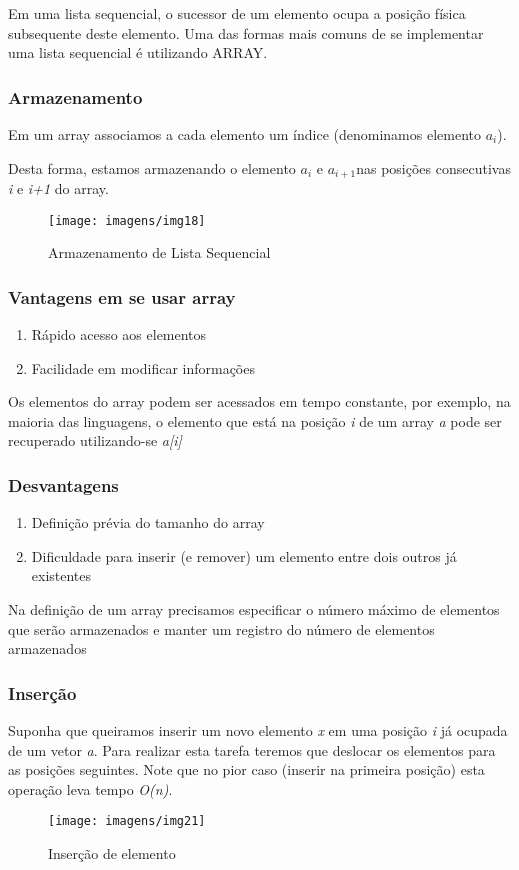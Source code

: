 \documentclass{beamer}
\begin{document}
\begin{frame}
Em uma lista sequencial, o sucessor de um elemento ocupa a posição física subsequente deste elemento. Uma das formas mais comuns de se implementar uma lista sequencial é utilizando ARRAY.
\end{frame}

\begin{frame}
\frametitle{Armazenamento}
Em um array associamos a cada elemento um índice (denominamos elemento $a_i$). 

Desta forma, estamos armazenando o elemento $a_i$  e $a_{i+1}$nas posições consecutivas  \textit{i} e \textit{i+1} do array.
 
\begin{figure}
\texttt{[image: imagens/img18]}
\caption{Armazenamento de Lista Sequencial}

\end{figure}

\end{frame}

\begin{frame}
\frametitle{Vantagens em se usar array}

\begin{enumerate}
\item Rápido acesso aos elementos
\item Facilidade em modificar informações
\end{enumerate}
Os elementos do array podem ser acessados em tempo constante, por exemplo, na maioria das linguagens, o elemento que está na posição \textit{i} de um array \textit{a} pode ser recuperado utilizando-se \textit{a[i]}
\end{frame}

\begin{frame}
\frametitle{Desvantagens}
\begin{enumerate}
\item Definição prévia do tamanho do array
\item Dificuldade para inserir (e remover) um elemento entre dois outros já existentes
\end{enumerate}

Na definição de um array precisamos especificar o número máximo de elementos que serão armazenados e manter um registro do número de elementos armazenados 
\end{frame}

\begin{frame}
\frametitle{Inserção}
Suponha que queiramos inserir um novo elemento \textit{x} em uma posição \textit{i} já ocupada de um vetor \textit{a}. Para realizar esta tarefa teremos que deslocar os elementos para as posições seguintes. Note que no pior caso (inserir na primeira posição) esta operação leva tempo \textit{O(n)}. 
\begin{figure}
\texttt{[image: imagens/img21]}
\caption{Inserção de elemento}
\end{figure}
\end{frame}
\end{document}

